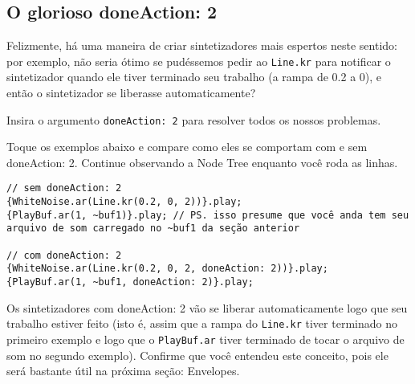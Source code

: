 \subsection{O glorioso doneAction: 2}

Felizmente, há uma maneira de criar sintetizadores mais espertos neste sentido: por exemplo, não seria ótimo se pudéssemos pedir ao \texttt{Line.kr} para notificar o sintetizador quando ele tiver terminado seu trabalho (a rampa de 0.2 a 0), e então o sintetizador se liberasse automaticamente?

Insira o argumento \texttt{doneAction: 2} para resolver todos os nossos problemas.

Toque os exemplos abaixo e compare como eles se comportam com e sem doneAction: 2. Continue observando a Node Tree enquanto você roda as linhas.
 
\begin{lstlisting}[style=SuperCollider-IDE, basicstyle=\scttfamily\footnotesize]
// sem doneAction: 2
{WhiteNoise.ar(Line.kr(0.2, 0, 2))}.play;
{PlayBuf.ar(1, ~buf1)}.play; // PS. isso presume que você anda tem seu arquivo de som carregado no ~buf1 da seção anterior

// com doneAction: 2
{WhiteNoise.ar(Line.kr(0.2, 0, 2, doneAction: 2))}.play;
{PlayBuf.ar(1, ~buf1, doneAction: 2)}.play;
\end{lstlisting}
 
Os sintetizadores com doneAction: 2 vão se liberar automaticamente logo que seu trabalho estiver feito (isto é, assim que a rampa do \texttt{Line.kr} tiver terminado no primeiro exemplo e logo que o \texttt{PlayBuf.ar} tiver terminado de tocar o arquivo de som no segundo exemplo). Confirme que você entendeu este conceito, pois ele será bastante útil na próxima seção: Envelopes.
